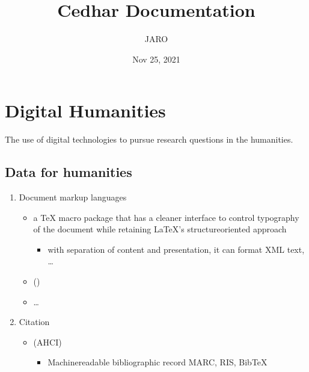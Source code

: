 \documentclass[a4paper,12pt,english]{sphinxhowto}
\title{Cedhar Documentation}
\date{Nov 25, 2021}
\author{JARO}
\begin{document}
\pagestyle{empty}
\sphinxmaketitle
\pagestyle{plain}
\sphinxtableofcontents
\pagestyle{normal}
\label{\detokenize{index::doc}}



\section{Digital Humanities}
\label{\detokenize{DDHH:digital-humanities}}\label{\detokenize{DDHH:ddhh}}\label{\detokenize{DDHH::doc}}
The use of digital technologies to pursue research questions in the humanities.


\subsection{Data for humanities}
\label{\detokenize{DDHH:data-for-humanities}}\begin{enumerate}
%
\item {} 
Document markup languages
\begin{itemize}
\item {} 
 a TeX macro package that has a cleaner interface to control typography of the document while retaining LaTeX’s structure\sphinxhyphen{}oriented approach
\begin{itemize}
\item {} 
with separation of content and presentation, it can format XML text, …

\end{itemize}

\item {} 
 ()

\item {} 
…

\end{itemize}

\item {} 
Citation
\begin{itemize}
\item {} 
 (AHCI)
\begin{itemize}
\item {} 
Machine\sphinxhyphen{}readable bibliographic record \sphinxhyphen{} MARC, RIS, BibTeX

\end{itemize}

\end{itemize}


\end{enumerate}
\end{document}
